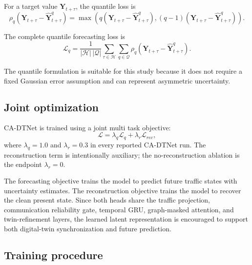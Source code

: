 \documentclass[pdflatex,sn-mathphys-num]{sn-jnl}%
\theoremstyle{thmstyleone}%
\theoremstyle{thmstyletwo}%
\theoremstyle{thmstylethree}%
\begin{document}
For a target value \(\mathbf{Y}_{t+\tau}\), the quantile loss is
\begin{equation}
    \rho_q
    \left(
    \mathbf{Y}_{t+\tau}
    -
    \widehat{\mathbf{Y}}_{t+\tau}^{q}
    \right)
    =
    \max
    \left(
    q
    \left(
    \mathbf{Y}_{t+\tau}
    -
    \widehat{\mathbf{Y}}_{t+\tau}^{q}
    \right),
    \left(q-1\right)
    \left(
    \mathbf{Y}_{t+\tau}
    -
    \widehat{\mathbf{Y}}_{t+\tau}^{q}
    \right)
    \right).
\end{equation}

The complete quantile forecasting loss is
\begin{equation}
    \mathcal{L}_{q}
    =
    \frac{1}{|\mathcal{H}|\,|\mathcal{Q}|}
    \sum_{\tau\in\mathcal{H}}
    \sum_{q\in\mathcal{Q}}
    \rho_q
    \left(
    \mathbf{Y}_{t+\tau}
    -
    \widehat{\mathbf{Y}}_{t+\tau}^{q}
    \right).
\end{equation}

The quantile formulation is suitable for this study because it does not require a fixed Gaussian error assumption and can represent asymmetric uncertainty.

\subsection{Joint optimization}
\label{subsec:joint_optimization}

CA-DTNet is trained using a joint multi task objective:
\begin{equation}
    \mathcal{L}
    =
    \lambda_{q}\mathcal{L}_{q}
    +
    \lambda_{r}\mathcal{L}_{rec},
\end{equation}
where \(\lambda_q=1.0\) and \(\lambda_r=0.3\) in every reported CA-DTNet run. The reconstruction term is intentionally auxiliary; the no-reconstruction ablation is the endpoint \(\lambda_r=0\).

The forecasting objective trains the model to predict future traffic states with uncertainty estimates. The reconstruction objective trains the model to recover the clean present state. Since both heads share the traffic projection, communication reliability gate, temporal GRU, graph-masked attention, and twin-refinement layers, the learned latent representation is encouraged to support both digital-twin synchronization and future prediction.

\subsection{Training procedure}
\label{subsec:training_procedure}
\end{document}
